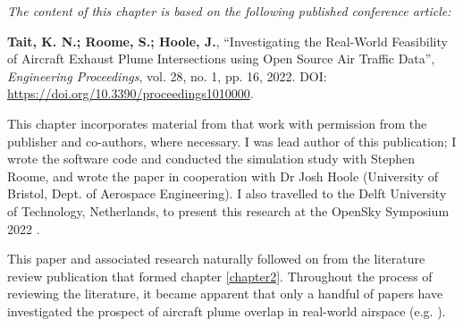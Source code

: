 \textit{The content of this chapter is based on the following published conference article:}

\textbf{Tait, K. N.; Roome, S.; Hoole, J.}, ``Investigating the Real-World Feasibility of Aircraft Exhaust Plume Intersections using Open Source Air Traffic Data'', \textit{Engineering Proceedings}, vol. 28, no. 1, pp. 16, 2022. DOI: \url{https://doi.org/10.3390/proceedings1010000}.

This chapter incorporates material from that work with permission from the publisher and co-authors, where necessary. I was lead author of this publication; I wrote the software code and conducted the simulation study with Stephen Roome, and wrote the paper in cooperation with Dr Josh Hoole (University of Bristol, Dept. of Aerospace Engineering). I also travelled to the Delft University of Technology, Netherlands, to present this research at the OpenSky Symposium 2022 \cite{Sun2022}.

This paper and associated research naturally followed on from the literature review publication that formed chapter \ref{chapter2}. Throughout the process of reviewing the literature, it became apparent that only a handful of papers have investigated the prospect of aircraft plume overlap in real-world airspace (e.g. \cite{Schlager1997}).









